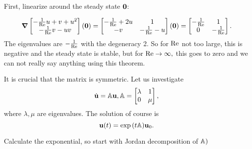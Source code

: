 \documentclass[reqno, a4paper]{article}
\begin{document}
First, linearize around the steady state $\vb{0}$:

\[
	\grad \begin{bmatrix}
		-\frac{1}{\mathrm{Re}}u +v + u^{2}\\
		- \frac{1}{\mathrm{Re}}v - uv
	\end{bmatrix}\qty(\vb{0}) = \begin{bmatrix}
	-\frac{1}{\mathrm{Re}} + 2u & 1 \\
	-v & -\frac{1}{\mathrm{Re}} - u
	\end{bmatrix}\qty(\vb{0}) = 
	\begin{bmatrix}
		-\frac{1}{\mathrm{Re}} & 1 \\
		0 & -\frac{1}{\mathrm{Re}}
	\end{bmatrix}.
\]
The eigenvalues are $- \frac{1}{\mathrm{Re}}$ with the degeneracy 2. So for $\mathrm{Re}$ not too large, this is negative and the steady state is stable, but for $\mathrm{Re} \to \infty, $ this goes to zero and we can not really say anything using this theorem.

It is crucial that the matrix is symmetric. Let us investigate
\[
	\dot{\vb{u}} = \mathbb{A} \vb{u}, \mathbb{A} = \begin{bmatrix}
		\lambda & 1 \\
		0 & \mu
	\end{bmatrix},
\]
where $\lambda, \mu$ are eigenvalues. The solution of course is
\[
	\vb{u}(t) = \exp\qty(t \mathbb{A}) \vb{u}_0.
\]

Calculate the exponential, so start with Jordan decomposition of $\mathbb{A})$
\end{document}
